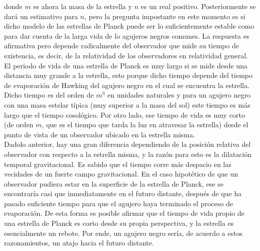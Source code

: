 \documentclass[16pt,a4paper]{article}
\numberwithin{equation}{section}
\theoremstyle{definition}
\begin{document}
donde $m$ es ahora la masa de la estrella y $n$ es un real positivo. Posteriormente se dará un estimativo para $n$, pero la pregunta impostante en este momento es si dicho modelo de las estrellas de Planck puede ser lo suficientemente estable como para dar cuenta de la larga vida de lo agujeros negros comunes. La respuesta es afirmativa pero depende radicalmente del observador que mide su tiempo de existencia, es decir, de la relatividad de los observadores en relatividad general. El periodo de vida de una estrella de Planck es muy largo si se mide desde una distancia muy grande a la estrella, esto porque dicho tiempo depende del tiempo de evaporación de Hawking del agujero negro en el cual se encuentra la estrella. Dicho tiempo es del orden de $m^3$ en unidades naturales y para un agujero negro con una masa estelar típica (muy superior a la masa del sol) este tiempo es más largo que el tiempo cosológico. Por otro lado, ese tiempo de vida es muy corto (de orden $m$, que es el tiempo que tarda la luz en atravesar la estrella) desde el punto de vista de un observador ubicado en la estrella misma.\\

Dadolo anterior, hay una gran diferencia dependiendo de la posición relativa del observador con respecto a la estrella misma, y la razón para esto es la dilatación temporal gravitacional. Es sabido que el tiempo corre más despacio en las vecidades de un fuerte campo gravitacional. En el caso hipotético de que un observador pudiera estar en la superficie de la estrella de Planck, ese se encontraría casi que inmediatamente en el futuro distante, después de que ha pasado suficiente tiempo para que el agujero haya terminado el proceso de evaporación. De esta forma es posible afirmar que el tiempo de vida propio de una estrella de Planck es corto desde su propia perspectiva, y la estrella es esencialmente un rebote. Por ende, un agujero negro sería, de acuerdo a estos razonamientos, un atajo hacia el futuro distante.\\
\end{document}
